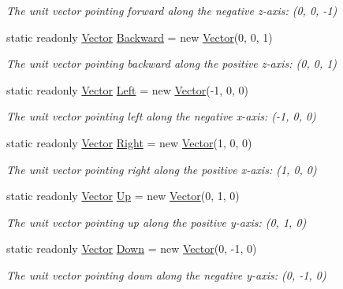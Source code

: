 \begin{DoxyCompactItemize}
\begin{DoxyCompactList}\small\item\em The unit vector pointing forward along the negative z-\/axis\+: (0, 0, -\/1) \end{DoxyCompactList}\item 
static readonly \mbox{\hyperlink{struct_leap_1_1_vector}{Vector}} \mbox{\hyperlink{struct_leap_1_1_vector_ad8dd1ac8e87611c590c9dcc58f8fdf8c}{Backward}} = new \mbox{\hyperlink{struct_leap_1_1_vector}{Vector}}(0, 0, 1)
\begin{DoxyCompactList}\small\item\em The unit vector pointing backward along the positive z-\/axis\+: (0, 0, 1) \end{DoxyCompactList}\item 
static readonly \mbox{\hyperlink{struct_leap_1_1_vector}{Vector}} \mbox{\hyperlink{struct_leap_1_1_vector_a62b9bbd54a4b89f695a106f42fcff881}{Left}} = new \mbox{\hyperlink{struct_leap_1_1_vector}{Vector}}(-\/1, 0, 0)
\begin{DoxyCompactList}\small\item\em The unit vector pointing left along the negative x-\/axis\+: (-\/1, 0, 0) \end{DoxyCompactList}\item 
static readonly \mbox{\hyperlink{struct_leap_1_1_vector}{Vector}} \mbox{\hyperlink{struct_leap_1_1_vector_aa2cefa3d6f93e552fcd95621e82da158}{Right}} = new \mbox{\hyperlink{struct_leap_1_1_vector}{Vector}}(1, 0, 0)
\begin{DoxyCompactList}\small\item\em The unit vector pointing right along the positive x-\/axis\+: (1, 0, 0) \end{DoxyCompactList}\item 
static readonly \mbox{\hyperlink{struct_leap_1_1_vector}{Vector}} \mbox{\hyperlink{struct_leap_1_1_vector_ad90a5266422b507db81c857829b9a915}{Up}} = new \mbox{\hyperlink{struct_leap_1_1_vector}{Vector}}(0, 1, 0)
\begin{DoxyCompactList}\small\item\em The unit vector pointing up along the positive y-\/axis\+: (0, 1, 0) \end{DoxyCompactList}\item 
static readonly \mbox{\hyperlink{struct_leap_1_1_vector}{Vector}} \mbox{\hyperlink{struct_leap_1_1_vector_a5f080cc88e908cd5d4c3e593767cdb17}{Down}} = new \mbox{\hyperlink{struct_leap_1_1_vector}{Vector}}(0, -\/1, 0)
\begin{DoxyCompactList}\small\item\em The unit vector pointing down along the negative y-\/axis\+: (0, -\/1, 0) \end{DoxyCompactList}\end{DoxyCompactItemize}
